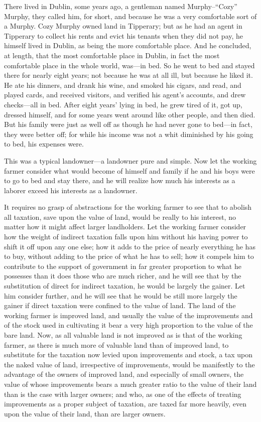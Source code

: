 \documentclass{book}
\begin{document}
There lived in Dublin, some years ago, a gentleman named Murphy–“Cozy” Murphy, they called him, for short, and because he was a very comfortable sort of a Murphy. Cozy Murphy owned land in Tipperary; but as he had an agent in Tipperary to collect his rents and evict his tenants when they did not pay, he himself lived in Dublin, as being the more comfortable place. And he concluded, at length, that the most comfortable place in Dublin, in fact the most comfortable place in the whole world, was—in bed. So he went to bed and stayed there for nearly eight years; not because he was at all ill, but because he liked it. He ate his dinners, and drank his wine, and smoked his cigars, and read, and played cards, and received visitors, and verified his agent’s accounts, and drew checks—all in bed. After eight years’ lying in bed, he grew tired of it, got up, dressed himself, and for some years went around like other people, and then died. But his family were just as well off as though he had never gone to bed—in fact, they were better off; for while his income was not a whit diminished by his going to bed, his expenses were.

This was a typical landowner—a landowner pure and simple. Now let the working farmer consider what would become of himself and family if he and his boys were to go to bed and stay there, and he will realize how much his interests as a laborer exceed his interests as a landowner.

It requires no grasp of abstractions for the working farmer to see that to abolish all taxation, save upon the value of land, would be really to his interest, no matter how it might affect larger landholders. Let the working farmer consider how the weight of indirect taxation falls upon him without his having power to shift it off upon any one else; how it adds to the price of nearly everything he has to buy, without adding to the price of what he has to sell; how it compels him to contribute to the support of government in far greater proportion to what he possesses than it does those who are much richer, and he will see that by the substitution of direct for indirect taxation, he would be largely the gainer. Let him consider further, and he will see that he would be still more largely the gainer if direct taxation were confined to the value of land. The land of the working farmer is improved land, and usually the value of the improvements and of the stock used in cultivating it bear a very high proportion to the value of the bare land. Now, as all valuable land is not improved as is that of the working farmer, as there is much more of valuable land than of improved land, to substitute for the taxation now levied upon improvements and stock, a tax upon the naked value of land, irrespective of improvements, would be manifestly to the advantage of the owners of improved land, and especially of small owners, the value of whose improvements bears a much greater ratio to the value of their land than is the case with larger owners; and who, as one of the effects of treating improvements as a proper subject of taxation, are taxed far more heavily, even upon the value of their land, than are larger owners.
\end{document}
